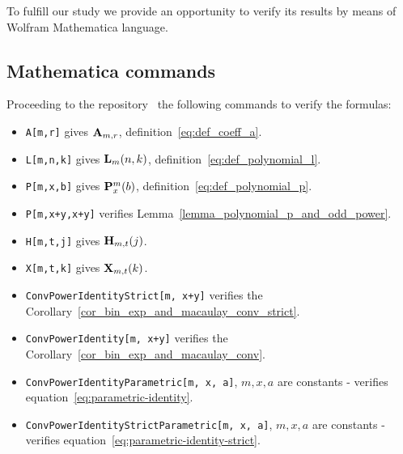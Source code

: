 To fulfill our study we provide an opportunity to verify its results by means of Wolfram Mathematica language.

\subsection{Mathematica commands} \label{subsec:mathematica-commands}
Proceeding to the repository~\cite{mmca_package} the following commands to verify the formulas:
\begin{itemize}
    \item \texttt{A[m,r]} gives ${\mathbf{A}} \sb{m,r}$, definition~\eqref{eq:def_coeff_a}.
    \item \texttt{L[m,n,k]} gives ${\mathbf{L}}\sb{m}(n,k)$, definition~\eqref{eq:def_polynomial_l}.
    \item \texttt{P[m,x,b]} gives ${\mathbf{P}}\sp{m} \sb{x}(b)$, definition~\eqref{eq:def_polynomial_p}.
    \item \texttt{P[m,x+y,x+y]} verifies Lemma~\ref{lemma_polynomial_p_and_odd_power}.
    \item \texttt{H[m,t,j]} gives ${\mathbf{H}} \sb{m,t} (j)$.
    \item \texttt{X[m,t,k]} gives ${\mathbf{X}}\sb{m,t} (k)$.
    \item \texttt{ConvPowerIdentityStrict[m, x+y]} verifies the Corollary~\ref{cor_bin_exp_and_macaulay_conv_strict}.
    \item \texttt{ConvPowerIdentity[m, x+y]} verifies the Corollary~\ref{cor_bin_exp_and_macaulay_conv}.
    \item \texttt{ConvPowerIdentityParametric[m, x, a]}, $m,x,a$ are constants - verifies equation~\eqref{eq:parametric-identity}.
    \item \texttt{ConvPowerIdentityStrictParametric[m, x, a]}, $m,x,a$ are constants - verifies equation~\eqref{eq:parametric-identity-strict}.
\end{itemize}

